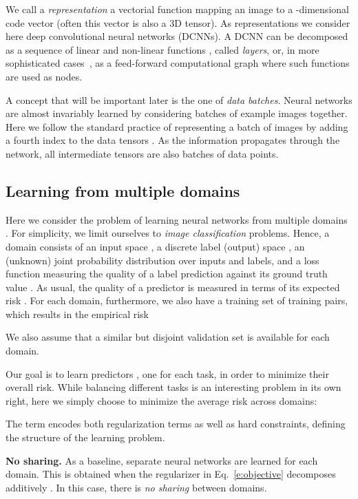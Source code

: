 \documentclass[10pt,twocolumn,letterpaper]{article}
\renewcommand{\paragraph}[1]{\par\medskip\noindent\textbf{#1}}
\begin{document}
We call a \emph{representation} a vectorial function  mapping an image  to a -dimensional code vector  (often this vector is also a 3D tensor). As representations we consider here deep convolutional neural networks (DCNNs). A DCNN can be decomposed as a sequence  of linear and non-linear functions , called \emph{layers}, or, in more sophisticated cases~\cite{szegedy16rethinking,he16deep}, as a feed-forward computational graph where such functions are used as nodes.

A concept that will be important later is the one of \emph{data batches}. Neural networks are almost invariably learned by considering batches of example images together. Here we follow the standard practice of representing a batch of  images by adding a fourth index  to the data tensors . As the information propagates through the network, all intermediate tensors are also batches of  data points.

\subsection{Learning from multiple domains}\label{s:mdomain}


Here we consider the problem of learning neural networks from multiple domains . For simplicity, we limit ourselves to \emph{image classification} problems. Hence, a domain  consists of an input space , a discrete label (output) space , an (unknown) joint probability distribution  over inputs and labels, and a loss function  measuring the quality  of a label prediction  against its ground truth value . As usual, the quality of a predictor  is measured in terms of its expected risk . For each domain, furthermore, we also have a training set  of  training pairs, which results in the empirical risk

We also assume that a similar but disjoint validation set  is available for each domain.

Our goal is to learn  predictors , one for each task, in order to minimize their overall risk. While balancing different tasks is an interesting problem in its own right, here we simply choose to minimize the average risk across domains:

The term  encodes both regularization terms as well as hard constraints, defining the structure of the learning problem.

\paragraph{No sharing.} As a baseline, separate neural networks are learned for each domain. This is obtained when the regularizer in Eq.~\ref{e:objective} decomposes additively . In this case, there is \emph{no sharing} between domains.
\end{document}
